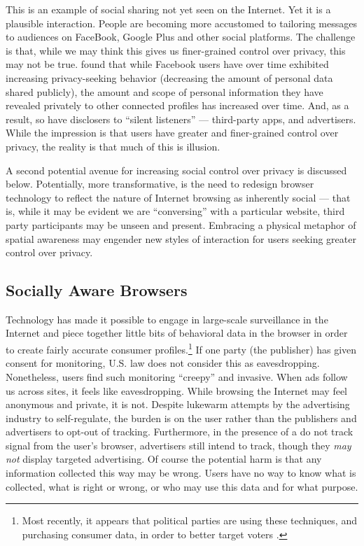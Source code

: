 This is an example of social sharing not yet seen on the Internet. Yet it is a plausible interaction. People are becoming more accustomed to tailoring messages to audiences on FaceBook, Google Plus and other social platforms. The challenge is that, while we may think this gives us finer-grained control over privacy, this may not be true.  \citet{Stutzman:2010ds}  found that while Facebook users have over time exhibited increasing privacy-seeking behavior (decreasing the amount of personal data shared publicly), the amount and scope of personal information they have revealed privately to other connected profiles has increased over time. And, as a result, so have disclosers to ``silent listeners'' --- third-party apps, and advertisers. While the impression is that users have greater and finer-grained control over privacy, the reality is that much of this is illusion. 

A second potential avenue for increasing social control over privacy is discussed below. Potentially, more transformative, is the need to redesign browser technology to reflect the nature of Internet browsing as inherently social --- that is, while it may be evident we are ``conversing'' with a particular website, third party participants may be unseen and present. Embracing a physical metaphor of spatial awareness may engender new styles of interaction for users seeking greater control over privacy.

\subsection{Socially Aware Browsers}
\label{sociallyawarebrowsers}

Technology has made it possible to engage in large-scale surveillance in the Internet and piece together little bits of behavioral data in the browser in order to create fairly accurate consumer profiles.\footnote{Most recently, it appears that political parties are using these techniques, and purchasing consumer data, in order to better target voters  \citep{Duhigg:2012uk}. } If one party (the publisher) has given consent for monitoring, U.S. law does not consider this as eavesdropping. Nonetheless, users find such monitoring ``creepy'' and invasive. When ads follow us across sites, it feels like eavesdropping. While browsing the Internet may feel anonymous and private, it is not. Despite lukewarm attempts by the advertising industry to self-regulate, the burden is on the user rather than the publishers and advertisers to opt-out of tracking. Furthermore, in the presence of a do not track signal from the user's browser, advertisers still intend to track, though they \emph{may not} display targeted advertising. Of course the potential harm is that any information collected this way may be wrong. Users have no way to know what is collected, what is right or wrong, or who may use this data and for what purpose.

